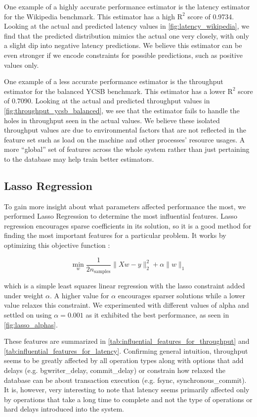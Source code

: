 One example of a highly accurate performance estimator is the latency estimator
for the Wikipedia benchmark. This estimator has a high $\textrm{R}^2$
score of 0.9734. Looking at the actual and predicted latency values in
\cref{fig:latency_wikipedia}, we find that the
predicted distribution mimics the actual one very closely, with only a
slight dip into negative latency predictions. We believe this
estimator can be even stronger if we encode constraints for possible
predictions, such as positive values only.

One example of a less accurate performance estimator is the throughput
estimator for the balanced YCSB benchmark. This estimator has a lower
$\textrm{R}^2$ score of 0.7090. Looking at the actual and predicted
throughput values in \cref{fig:throughput_ycsb_balanced}, we see that
the estimator fails to handle the holes in throughput seen in the
actual values. We believe these isolated throughput values are due to
environmental factors that are not reflected in the feature set such
as load on the machine and other processes' resource usages. A more
``global'' set of features across the whole system rather than just
pertaining to the database may help train better estimators.

\subsection{Lasso Regression}
\label{sec:lasso}

To gain more insight about what parameters affected performance the
most, we performed Lasso Regression to determine the most influential
features. Lasso regression encourages sparse coefficients in its
solution, so it is a good method for finding the most important
features for a particular problem. It works by optimizing this
objective function :

\begin{equation*}
  \min\limits_{w}
  \frac{1}{2n_{\textrm{samples}}} \|Xw - y\|_2^2 + \alpha \|w\|_1
\end{equation*}

which is a simple least squares linear regression with the lasso
constraint added under weight $\alpha$. A higher value for $\alpha$
encourages sparser solutions while a lower value relaxes this
constraint. We experimented with different values of alpha and settled
on using $\alpha = 0.001$ as it exhibited the best performance, as seen in
\cref{fig:lasso_alphas}.

 These features are summarized in
\cref{tab:influential_features_for_throughput} and
\cref{tab:influential_features_for_latency}. Confirming general
intuition, throughput seems to be greatly affected by all operation
types along with options that add delays (e.g. bgwriter\_delay,
commit\_delay) or constrain how relaxed the database can be about
transaction execution (e.g. fsync, synchronous\_commit). It
is, however, very interesting to note that latency seems 
primarily affected only by operations that take a long time to 
complete and not the type of operations or hard delays introduced into the
system.

